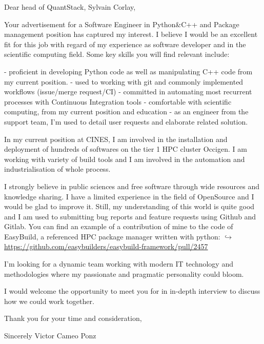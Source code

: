 Dear head of QuantStack, Sylvain Corlay,

Your advertisement for a Software Engineer in Python\&C++ and Package
management position has captured my interest. I believe I would be an excellent
fit for this job with regard of my experience as software developer and in the
scientific computing field. Some key skills you will find relevant include:

 - proficient in developing Python code as well as manipulating C++ code from my
current position.
 - used to working with git and commonly implemented workflows (issue/merge
request/CI)
 - committed in automating most recurrent processes with Continuous Integration
tools
 - comfortable with scientific computing, from my current position and education
 - as an engineer from the support team, I'm used to detail user requests and
elaborate related solution.


In my current position at CINES, I am involved in the installation and deployment
of hundreds of softwares on the tier 1 HPC cluster Occigen. I am working with
variety of build tools and I am involved in the automation and industrialisation
of whole process.

I strongly believe in public sciences and free software through wide resources and
knowledge sharing. I have a limited experience in the field of OpenSource and I
would be glad to improve it. Still, my understanding of this world is quite good
and I am used to submitting bug reports and feature requests using Github and Gitlab.
You can find an example of a contribution of mine to the code of EasyBuild, a
referenced HPC package manager written with python:
\href{https://github.com/easybuilders/easybuild-framework/pull/2457}
{$\hookrightarrow$ https://github.com/easybuilders/easybuild-framework/pull/2457}

I'm looking for a dynamic team working with modern IT technology and
methodologies where my passionate and pragmatic personality could bloom.

I would welcome the opportunity to meet you for in in-depth interview to discuss
how we could work together.

Thank you for your time and consideration,

Sincerely
Victor Cameo Ponz



